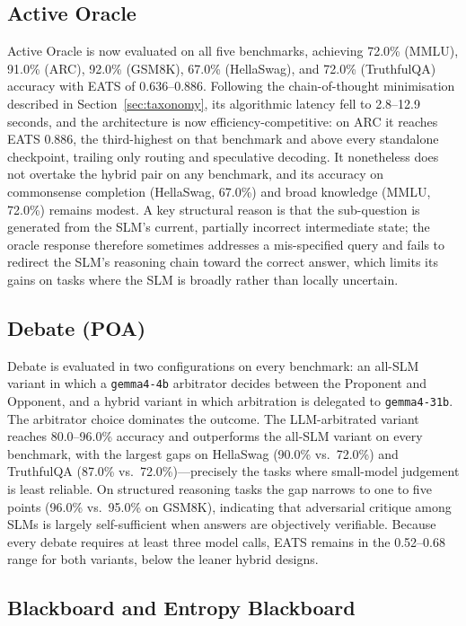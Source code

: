 \subsection{Active Oracle}

Active Oracle is now evaluated on all five benchmarks, achieving 72.0\% (MMLU), 91.0\% (ARC), 92.0\% (GSM8K), 67.0\% (HellaSwag), and 72.0\% (TruthfulQA) accuracy with EATS of 0.636--0.886. Following the chain-of-thought minimisation described in Section~\ref{sec:taxonomy}, its algorithmic latency fell to 2.8--12.9 seconds, and the architecture is now efficiency-competitive: on ARC it reaches EATS 0.886, the third-highest on that benchmark and above every standalone checkpoint, trailing only routing and speculative decoding. It nonetheless does not overtake the hybrid pair on any benchmark, and its accuracy on commonsense completion (HellaSwag, 67.0\%) and broad knowledge (MMLU, 72.0\%) remains modest. A key structural reason is that the sub-question is generated from the SLM's current, partially incorrect intermediate state; the oracle response therefore sometimes addresses a mis-specified query and fails to redirect the SLM's reasoning chain toward the correct answer, which limits its gains on tasks where the SLM is broadly rather than locally uncertain.

\subsection{Debate (POA)}

Debate is evaluated in two configurations on every benchmark: an all-SLM variant in which a \texttt{gemma4-4b} arbitrator decides between the Proponent and Opponent, and a hybrid variant in which arbitration is delegated to \texttt{gemma4-31b}. The arbitrator choice dominates the outcome. The LLM-arbitrated variant reaches 80.0--96.0\% accuracy and outperforms the all-SLM variant on every benchmark, with the largest gaps on HellaSwag (90.0\% vs.\ 72.0\%) and TruthfulQA (87.0\% vs.\ 72.0\%)---precisely the tasks where small-model judgement is least reliable. On structured reasoning tasks the gap narrows to one to five points (96.0\% vs.\ 95.0\% on GSM8K), indicating that adversarial critique among SLMs is largely self-sufficient when answers are objectively verifiable. Because every debate requires at least three model calls, EATS remains in the 0.52--0.68 range for both variants, below the leaner hybrid designs.

\subsection{Blackboard and Entropy Blackboard}

